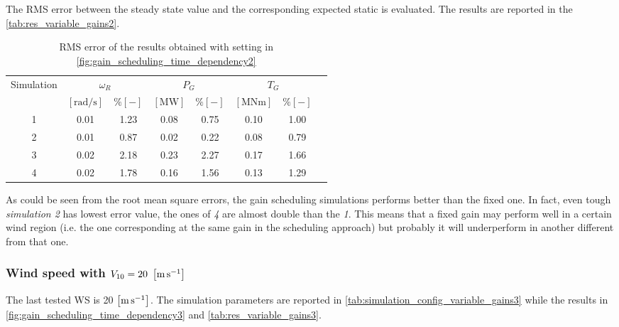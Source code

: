 The \acrshort{RMS} error between the steady state value and the corresponding expected static is evaluated. The results are reported in the \autoref{tab:res_variable_gains2}.
\begin{table}[htb]
  \caption{RMS error of the results obtained with setting in \autoref{fig:gain_scheduling_time_dependency2}}
  \centering
  \begin{tabular}{cccccccc}
    \toprule
      Simulation & \multicolumn{2}{c}{$\omega_R$} & \multicolumn{2}{c}{$P_G$} & \multicolumn{2}{c}{$T_G$} \\ 
       & $\left[\si{\radian\per\second}\right]$ & $ \% \left[-\right]$ & $\left[\si{\mega\watt}\right]$ & $ \% \left[-\right]$ & $\left[\si{\mega\newton\meter} \right]$ & $ \% \left[-\right]$ \\ \midrule      
     1 & 0.01 &  1.23 &  0.08  &  0.75  &  0.10  &  1.00 \\
     2 & 0.01 &  0.87 &  0.02  &  0.22  &  0.08  &  0.79 \\
     3 & 0.02 &  2.18 &  0.23  &  2.27  &  0.17  &  1.66 \\
     4 & 0.02 &  1.78 &  0.16  &  1.56  &  0.13  &  1.29 \\
    
     \bottomrule
  \end{tabular}
  \label{tab:res_variable_gains2}
\end{table}

As could be seen from the root mean square errors, the gain scheduling simulations performs better than the fixed one. In fact, even tough \textit{simulation 2} has lowest error value, the ones of \textit{4} are almost double than the \textit{1}. This means that a fixed gain may perform well in a certain wind region (i.e. the one corresponding at the same gain in the scheduling approach) but probably it will underperform in another different from that one.  

\subsubsection{Wind speed with $V_{10} =  20 \ \mesunt{\meter\per\second}$}
The last tested \acrshort{WS} is 20 $\left[\si{\meter\per\second}\right]$. The simulation parameters are reported in \autoref{tab:simulation_config_variable_gains3} while the results in \autoref{fig:gain_scheduling_time_dependency3} and \autoref{tab:res_variable_gains3}.

